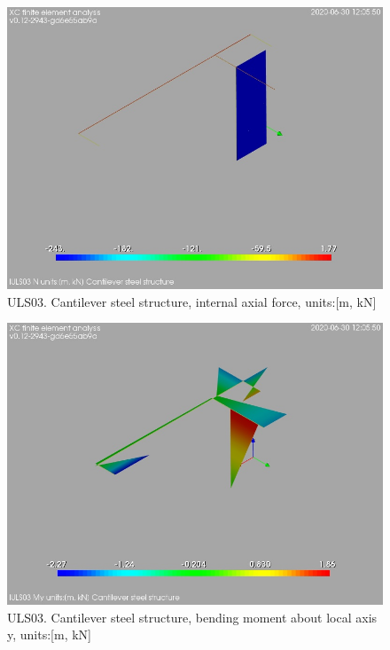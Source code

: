 \begin{figure}
\begin{center}
\includegraphics[width=\linewidth]{ramp_wall/resLC/text/graphics/resSimplLC/lULS03steelMembersN}
\caption{ULS03. Cantilever steel structure, internal axial force, units:[m, kN]}
\end{center}
\end{figure}
\begin{figure}
\begin{center}
\includegraphics[width=\linewidth]{ramp_wall/resLC/text/graphics/resSimplLC/lULS03steelMembersMy}
\caption{ULS03. Cantilever steel structure, bending moment about local axis y, units:[m, kN]}
\end{center}
\end{figure}
